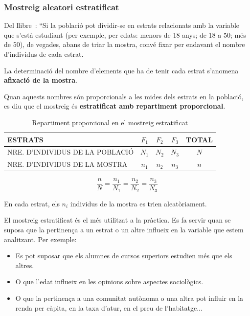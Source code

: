 \subsubsection{Mostreig aleatori estratificat}
Del llibre~\cite{Llibre_MACS_II}:
``Si la població pot dividir-se en estrats relacionats amb la variable que s'està estudiant (per exemple, per edats: menors de 18 anys; de 18 a 50; més de 50), de vegades, abans de triar la mostra, convé fixar per endavant el nombre d'individus de cada estrat.

La determinació del nombre d'elements que ha de tenir cada estrat s'anomena \textbf{afixació de la mostra}.

Quan aquests nombres són proporcionals a les mides dels estrats en la població, es diu que el mostreig és \textbf{estratificat amb repartiment proporcional}.

\begin{table}[h!]
    \centering
    \begin{tabular}{l|c|c|c|c}
        \hline
        ESTRATS & $F_1$ & $F_2$ & $F_3$ & TOTAL \\
        \hline
        NRE. D'INDIVIDUS DE LA POBLACIÓ & $N_1$ & $N_2$ & $N_3$ & $N$ \\
        \hline
        NRE. D'INDIVIDUS DE LA MOSTRA & $n_1$ & $n_2$ & $n_3$ & $n$ \\
        \hline
    \end{tabular}
    \caption{Repartiment proporcional en el mostreig estratificat}
    \label{tau-mostreig-estratificat}
\end{table}

$$\frac{n}{N}=\frac{n_1}{N_1}=\frac{n_2}{N_2}=\frac{n_3}{N_3}$$

En cada estrat, els $n_i$ individus de la mostra es trien aleatòriament.

El mostreig estratificat és el més utilitzat a la pràctica. Es fa servir quan se suposa que la pertinença a un estrat o un altre influeix en la variable que estem analitzant. Per exemple:

\begin{itemize}
 \item Es pot suposar que els alumnes de cursos superiors estudien més que els altres.
 \item O que l'edat influeix en les opinions sobre aspectes sociològics.
 \item O que la pertinença a una comunitat autònoma o una altra pot influir en la renda per càpita, en la taxa d'atur, en el preu de l'habitatge...
\end{itemize}

